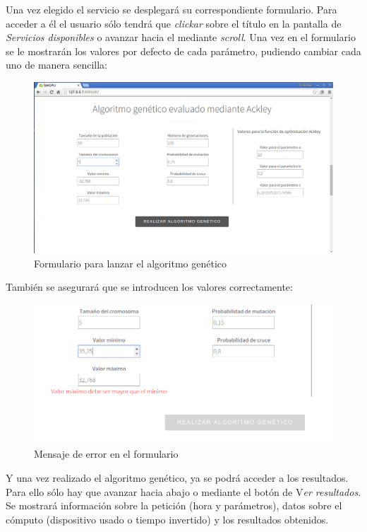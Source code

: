 \bigskip
Una vez elegido el servicio se desplegará su correspondiente formulario. Para acceder a él el usuario sólo tendrá que \textit{clickar} sobre el título en la pantalla de \textit{Servicios disponibles} o avanzar hacia el mediante \textit{scroll}. Una vez en el formulario se le mostrarán los valores por defecto de cada parámetro, pudiendo cambiar cada uno de manera sencilla:

\bigskip
\begin{figure}[h]
	\centering
	\includegraphics[width=0.9\linewidth]{../images/captura_web_3}
	\caption[Formulario para lanzar el algoritmo genético]{Formulario para lanzar el algoritmo genético}
	\label{fig:captura_web_3}
\end{figure}

\bigskip
También se asegurará que se introducen los valores correctamente:

\bigskip
\begin{figure}[h]
	\centering
	\includegraphics[width=0.7\linewidth]{../images/captura_web_3_1}
	\caption[Mensaje de error en el formulario]{Mensaje de error en el formulario}
	\label{fig:captura_web_3_1}
\end{figure}


\bigskip
Y una vez realizado el algoritmo genético, ya se podrá acceder a los resultados. Para ello sólo hay que avanzar hacia abajo o mediante el botón de V\textit{er resultados}. Se mostrará información sobre la petición (hora y parámetros), datos sobre el cómputo (dispositivo usado o tiempo invertido) y los resultados obtenidos.

